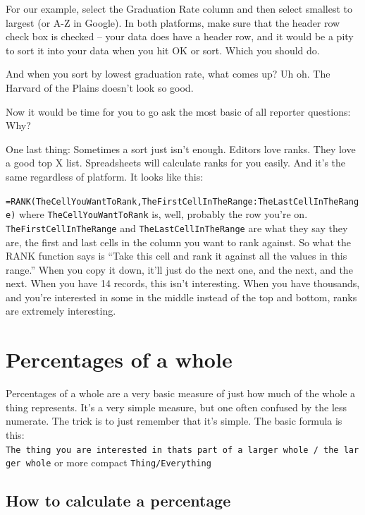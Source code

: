 \documentclass[
]{book}
\begin{document}
For our example, select the Graduation Rate column and then select smallest to largest (or A-Z in Google). In both platforms, make sure that the header row check box is checked -- your data does have a header row, and it would be a pity to sort it into your data when you hit OK or sort. Which you should do.

And when you sort by lowest graduation rate, what comes up? Uh oh. The Harvard of the Plains doesn't look so good.

Now it would be time for you to go ask the most basic of all reporter questions: Why?

One last thing: Sometimes a sort just isn't enough. Editors love ranks. They love a good top X list. Spreadsheets will calculate ranks for you easily. And it's the same regardless of platform. It looks like this:

\texttt{=RANK(TheCellYouWantToRank,TheFirstCellInTheRange:TheLastCellInTheRange)} where \texttt{TheCellYouWantToRank} is, well, probably the row you're on. \texttt{TheFirstCellInTheRange} and \texttt{TheLastCellInTheRange} are what they say they are, the first and last cells in the column you want to rank against. So what the RANK function says is ``Take this cell and rank it against all the values in this range.'' When you copy it down, it'll just do the next one, and the next, and the next. When you have 14 records, this isn't interesting. When you have thousands, and you're interested in some in the middle instead of the top and bottom, ranks are extremely interesting.

\hypertarget{percentages-of-a-whole}{%
\chapter{Percentages of a whole}\label{percentages-of-a-whole}}

Percentages of a whole are a very basic measure of just how much of the whole a thing represents. It's a very simple measure, but one often confused by the less numerate. The trick is to just remember that it's simple. The basic formula is this: \texttt{The\ thing\ you\ are\ interested\ in\ that\textquotesingle{}s\ part\ of\ a\ larger\ whole\ /\ the\ larger\ whole} or more compact \texttt{Thing/Everything}

\hypertarget{how-to-calculate-a-percentage}{%
\section{How to calculate a percentage}\label{how-to-calculate-a-percentage}}
\end{document}
